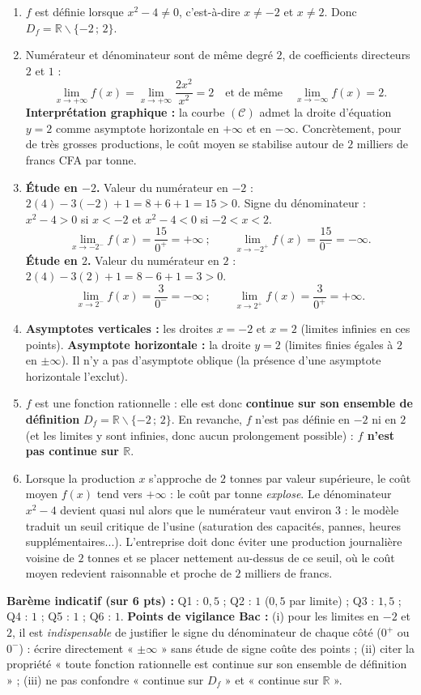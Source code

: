 \documentclass[11pt]{article}
\def\setminus{\mathbin{\backslash}}\let\smallsetminus\setminus
\begin{document}
\begin{corrige}
\begin{enumerate}
\item $f$ est définie lorsque $x^2-4\neq 0$, c'est-à-dire $x\neq -2$ et $x\neq 2$. Donc $D_f=\mathbb{R}\setminus\{-2\,;\,2\}$.
\item Numérateur et dénominateur sont de même degré $2$, de coefficients directeurs $2$ et $1$ :
\[ \lim_{x\to +\infty}f(x)=\lim_{x\to +\infty}\frac{2x^2}{x^2}=\boxed{2}\quad\text{et de même}\quad\lim_{x\to -\infty}f(x)=\boxed{2}. \]
\textbf{Interprétation graphique :} la courbe $(\mathcal{C})$ admet la droite d'équation $y=2$ comme asymptote horizontale en $+\infty$ et en $-\infty$. Concrètement, pour de très grosses productions, le coût moyen se stabilise autour de $2$ milliers de francs CFA par tonne.
\item \textbf{Étude en $-2$.} Valeur du numérateur en $-2$ : $2(4)-3(-2)+1=8+6+1=15>0$.
Signe du dénominateur : $x^2-4>0$ si $x<-2$ et $x^2-4<0$ si $-2<x<2$.
\[ \lim_{x\to -2^-}f(x)=\frac{15}{0^+}=\boxed{+\infty}\ ;\qquad \lim_{x\to -2^+}f(x)=\frac{15}{0^-}=\boxed{-\infty}. \]
\textbf{Étude en $2$.} Valeur du numérateur en $2$ : $2(4)-3(2)+1=8-6+1=3>0$.
\[ \lim_{x\to 2^-}f(x)=\frac{3}{0^-}=\boxed{-\infty}\ ;\qquad \lim_{x\to 2^+}f(x)=\frac{3}{0^+}=\boxed{+\infty}. \]
\item \textbf{Asymptotes verticales :} les droites $x=-2$ et $x=2$ (limites infinies en ces points).
\textbf{Asymptote horizontale :} la droite $y=2$ (limites finies égales à $2$ en $\pm\infty$).
Il n'y a pas d'asymptote oblique (la présence d'une asymptote horizontale l'exclut).
\item $f$ est une fonction rationnelle : elle est donc \textbf{continue sur son ensemble de définition} $D_f=\mathbb{R}\setminus\{-2\,;\,2\}$. En revanche, $f$ n'est pas définie en $-2$ ni en $2$ (et les limites y sont infinies, donc aucun prolongement possible) : \textbf{$f$ n'est pas continue sur $\mathbb{R}$}.
\item Lorsque la production $x$ s'approche de $2$ tonnes par valeur supérieure, le coût moyen $f(x)$ tend vers $+\infty$ : le coût par tonne \emph{explose}. Le dénominateur $x^2-4$ devient quasi nul alors que le numérateur vaut environ $3$ : le modèle traduit un seuil critique de l'usine (saturation des capacités, pannes, heures supplémentaires...). L'entreprise doit donc éviter une production journalière voisine de $2$ tonnes et se placer nettement au-dessus de ce seuil, où le coût moyen redevient raisonnable et proche de $2$ milliers de francs.
\end{enumerate}
\textbf{Barème indicatif (sur 6 pts) :} Q1 : $0,5$ ; Q2 : $1$ ($0,5$ par limite) ; Q3 : $1,5$ ; Q4 : $1$ ; Q5 : $1$ ; Q6 : $1$.
\textbf{Points de vigilance Bac :} (i) pour les limites en $-2$ et $2$, il est \emph{indispensable} de justifier le signe du dénominateur de chaque côté ($0^+$ ou $0^-$) : écrire directement « $\pm\infty$ » sans étude de signe coûte des points ; (ii) citer la propriété « toute fonction rationnelle est continue sur son ensemble de définition » ; (iii) ne pas confondre « continue sur $D_f$ » et « continue sur $\mathbb{R}$ ».
\end{corrige}
\end{document}
